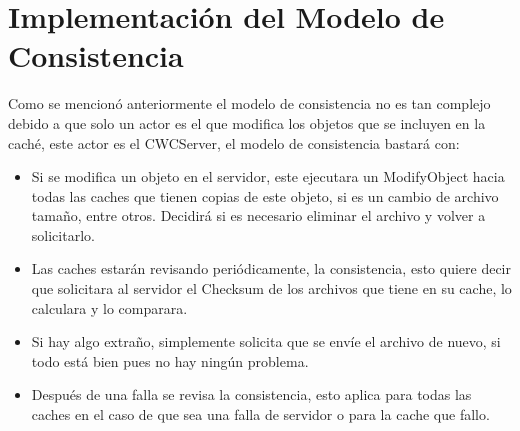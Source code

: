 \section{Implementación del Modelo de Consistencia}
Como se mencionó anteriormente el modelo de consistencia no es tan complejo debido a que solo un actor es el que modifica los objetos que se incluyen en la caché, este actor es el CWCServer, el modelo de consistencia bastará con:

\begin{itemize}
\item Si se modifica un objeto en el servidor, este ejecutara un ModifyObject hacia todas las caches que tienen copias de este objeto, si es un cambio de archivo tamaño, entre otros. Decidirá si es necesario eliminar el archivo y volver a solicitarlo.
\item Las caches estarán revisando periódicamente, la consistencia, esto quiere decir que solicitara al servidor el Checksum de los archivos que tiene en su cache, lo calculara y lo comparara.
\item Si hay algo extraño, simplemente solicita que se envíe el archivo de nuevo, si todo está bien pues no hay ningún problema.
\item Después de una falla se revisa la consistencia, esto aplica para todas las caches en el caso de que sea una falla de servidor o para la cache que fallo.
\end{itemize}